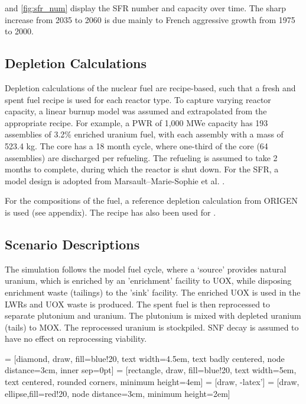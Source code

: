  and \cref{fig:sfr_num} display
the \gls{SFR} number and capacity over time.
The sharp increase from 2035 to 2060 is due mainly to
French aggressive growth from 1975 to 2000.



\subsection{Depletion Calculations}
Depletion calculations of the nuclear fuel are recipe-based, such that a fresh 
and spent fuel recipe is used for each reactor type. To capture varying reactor 
capacity, a linear burnup model was assumed and extrapolated from the 
appropriate recipe. For example, a PWR of
1,000 MWe capacity has 193 assemblies of 3.2\% enriched
uranium fuel, with each assembly with a mass of 523.4 kg.
The core has a 18 month cycle, where one-third of the 
core (64 assemblies) are discharged per refueling. The refueling
is assumed to take 2 months to complete, during which the reactor
is shut down. For the \gls{SFR}, a model design is adopted from
Marsault–Marie-Sophie et al. \cite{marsaultmarie-sophie_pre-conceptual_2012}.

For the compositions of the fuel, a reference depletion calculation
from ORIGEN is used (see appendix). The recipe has also been used for
\cite{wilson_adoption_2009}.

\subsection{Scenario Descriptions}
The simulation follows the model fuel cycle, where a `source'
provides natural uranium, which is enriched by an 'enrichment'
facility to \gls{UOX}, while disposing enrichment waste (tailings)
to the 'sink' facility. The enriched \gls{UOX} is used
in the \gls{LWR}s and \gls{UOX} waste is produced. The spent fuel
is then reprocessed to separate plutonium and uranium.
The plutonium is mixed with depleted uranium (tails) to \gls{MOX}.
The reprocessed uranium is stockpiled. \gls{SNF} decay is assumed
to have no effect on reprocessing viability.


 = [diamond, draw, fill=blue!20, 
text width=4.5em, text badly centered, node distance=3cm, inner sep=0pt]
 = [rectangle, draw, fill=blue!20, 
text width=5em, text centered, rounded corners, minimum height=4em]
 = [draw, -latex']
 = [draw, ellipse,fill=red!20, node distance=3cm,
minimum height=2em]


